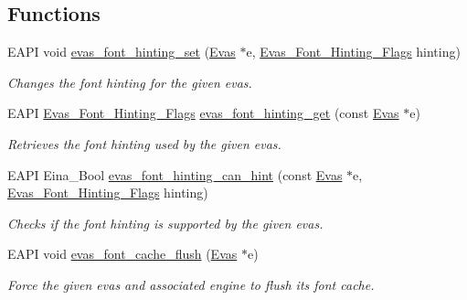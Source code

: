 \subsection*{Functions}
\begin{DoxyCompactItemize}
\item 
EAPI void \hyperlink{group__Evas__Font__Group_gaf39062952fc420ff32fbacfb8c27bd7d}{evas\_\-font\_\-hinting\_\-set} (\hyperlink{group__Evas__Canvas_ga5ff87cc4ce6bc43e3b640a6d37f73043}{Evas} $\ast$e, \hyperlink{group__Evas__Font__Group_gaaed9273c1705a3d2356470c60b2f5aa5}{Evas\_\-Font\_\-Hinting\_\-Flags} hinting)
\begin{DoxyCompactList}\small\item\em Changes the font hinting for the given evas. \item\end{DoxyCompactList}\item 
EAPI \hyperlink{group__Evas__Font__Group_gaaed9273c1705a3d2356470c60b2f5aa5}{Evas\_\-Font\_\-Hinting\_\-Flags} \hyperlink{group__Evas__Font__Group_gafe785a87743b72d8064f0562fd79cc75}{evas\_\-font\_\-hinting\_\-get} (const \hyperlink{group__Evas__Canvas_ga5ff87cc4ce6bc43e3b640a6d37f73043}{Evas} $\ast$e)
\begin{DoxyCompactList}\small\item\em Retrieves the font hinting used by the given evas. \item\end{DoxyCompactList}\item 
EAPI Eina\_\-Bool \hyperlink{group__Evas__Font__Group_gaa4210fa6661330e67ec4c9cbde775b4b}{evas\_\-font\_\-hinting\_\-can\_\-hint} (const \hyperlink{group__Evas__Canvas_ga5ff87cc4ce6bc43e3b640a6d37f73043}{Evas} $\ast$e, \hyperlink{group__Evas__Font__Group_gaaed9273c1705a3d2356470c60b2f5aa5}{Evas\_\-Font\_\-Hinting\_\-Flags} hinting)
\begin{DoxyCompactList}\small\item\em Checks if the font hinting is supported by the given evas. \item\end{DoxyCompactList}\item 
EAPI void \hyperlink{group__Evas__Font__Group_gad75ac8ed0c921e774f1c519a66f05a2f}{evas\_\-font\_\-cache\_\-flush} (\hyperlink{group__Evas__Canvas_ga5ff87cc4ce6bc43e3b640a6d37f73043}{Evas} $\ast$e)
\begin{DoxyCompactList}\small\item\em Force the given evas and associated engine to flush its font cache. \item\end{DoxyCompactList}\item 

\end{DoxyCompactItemize}
